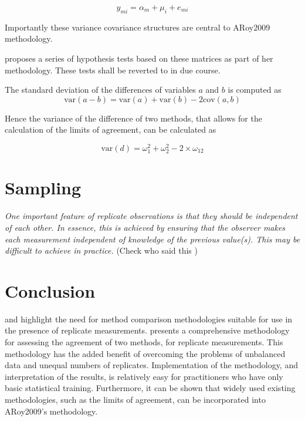\documentclass[12pt, a4paper]{report}
\theoremstyle{plain}
\theoremstyle{definition}
\theoremstyle{remark}
\begin{document}
	\[ y_{mi} =  \alpha_{m}  + \mu_{i} + e_{mi}  \]
	
	
	
	
	
	Importantly these variance covariance structures are central to ARoy2009 methodology.
	
	
	\citet{ARoy2009} proposes a series of hypothesis tests based on these matrices as part of her methodology. These tests shall be reverted to in due course.
	
	The standard deviation of the differences of variables $a$ and $b$ is computed as
	\[
	\mbox{var}(a - b) = \mbox{var} ( a )  + \mbox{var} ( b ) - 2\mbox{cov} ( a ,b )
	\]
	
	Hence the variance of the difference of two methods, that allows for the calculation of the limits of agreement, can be calculated as
	
	\[
	\mbox{var}(d) = \omega^2_1  + \omega^2_2 - 2 \times \omega_12
	\]
	
	
	
	
	
	\section{Sampling}
	\emph{
		One important feature of replicate observations is that they should be independent
		of each other. In essence, this is achieved by ensuring that the observer makes each
		measurement independent of knowledge of the previous value(s). This may be difficult
		to achieve in practice.} (Check who said this
	)
	
	
	
	
	
	
	
	\section{Conclusion}
	\citet{BXC2008} and \citet{AARoy20092009} highlight the need for method comparison methodologies suitable for use in the presence of replicate measurements. \citet{AARoy20092009} presents a comprehensive methodology for assessing the agreement of two methods, for replicate measurements. This methodology has the added benefit of overcoming the problems of unbalanced data and unequal numbers of replicates. Implementation of the methodology, and interpretation of the results, is relatively easy for practitioners who have only basic statistical training. Furthermore, it can be shown that widely used existing methodologies, such as the limits of agreement, can be incorporated into ARoy2009's methodology.
	
\end{document}
